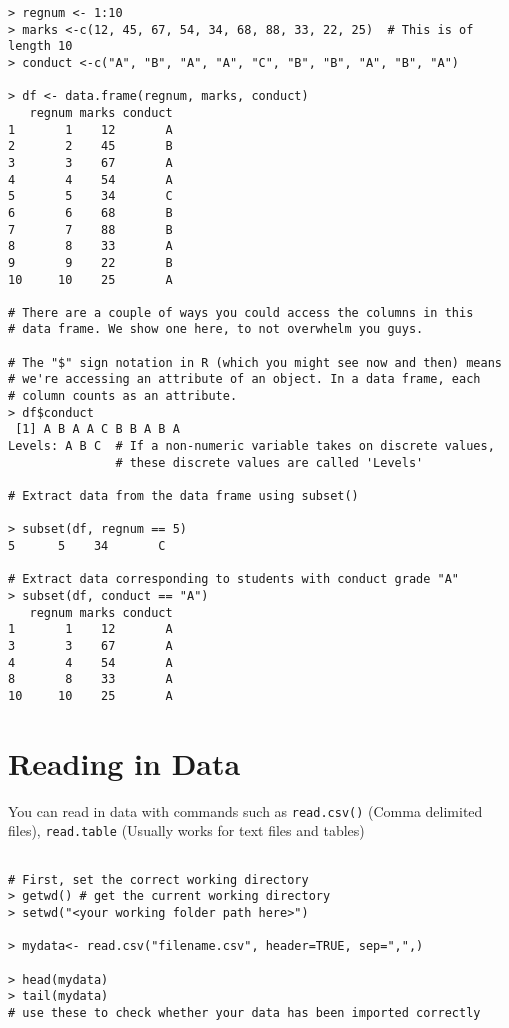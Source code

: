 \documentclass[12pt]{article}
\begin{document}
\begin{itemize}
\begin{verbatim}
> regnum <- 1:10
> marks <-c(12, 45, 67, 54, 34, 68, 88, 33, 22, 25)  # This is of length 10
> conduct <-c("A", "B", "A", "A", "C", "B", "B", "A", "B", "A")

> df <- data.frame(regnum, marks, conduct)
   regnum marks conduct
1       1    12       A
2       2    45       B
3       3    67       A
4       4    54       A
5       5    34       C
6       6    68       B
7       7    88       B
8       8    33       A
9       9    22       B
10     10    25       A

# There are a couple of ways you could access the columns in this
# data frame. We show one here, to not overwhelm you guys.

# The "$" sign notation in R (which you might see now and then) means
# we're accessing an attribute of an object. In a data frame, each
# column counts as an attribute.
> df$conduct
 [1] A B A A C B B A B A
Levels: A B C  # If a non-numeric variable takes on discrete values,
               # these discrete values are called 'Levels'

# Extract data from the data frame using subset()

> subset(df, regnum == 5)
5      5    34       C

# Extract data corresponding to students with conduct grade "A"
> subset(df, conduct == "A")
   regnum marks conduct
1       1    12       A
3       3    67       A
4       4    54       A
8       8    33       A
10     10    25       A

\end{verbatim}

\section{Reading in Data}

You can read in data with commands such as \texttt{read.csv()} (Comma delimited files),
\texttt{read.table} (Usually works for text files and tables)

\begin{verbatim}

# First, set the correct working directory
> getwd() # get the current working directory
> setwd("<your working folder path here>")

> mydata<- read.csv("filename.csv", header=TRUE, sep=",",)

> head(mydata)
> tail(mydata)
# use these to check whether your data has been imported correctly
\end{verbatim}



\end{itemize}
\end{document}
